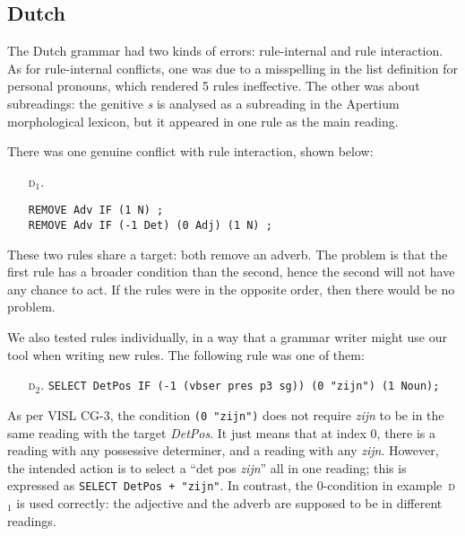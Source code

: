 \subsection{Dutch} The Dutch grammar had two kinds of errors: rule-internal and rule interaction. As for rule-internal conflicts, one was due to a misspelling in the list definition for personal pronouns, which rendered 5 rules ineffective. The other was about subreadings: the genitive \emph{s} is analysed as a subreading in the Apertium morphological lexicon, but it appeared in one rule as the main reading. 

There was one genuine conflict with rule interaction, shown below:

\begin{itemize}
\item[\textsc{d$_1$.}] 
\begin{verbatim}REMOVE Adv IF (1 N) ;
REMOVE Adv IF (-1 Det) (0 Adj) (1 N) ;
\end{verbatim}
\end{itemize}

These two rules share a target: both remove an adverb.
The problem is that the first rule has a broader condition than the second, hence the second will not have any chance to act. 
If the rules were in the opposite order, then there would be no problem.



We also tested rules individually, in a way that a grammar writer might use our tool when writing new rules.
The following rule was one of them:

\begin{itemize}
\item[\textsc{d$_2$.}] 
\texttt{SELECT DetPos IF (-1 (vbser pres p3 sg)) (0 "zijn") (1 Noun);}
\end{itemize} 

As per VISL CG-3, the condition \texttt{(0 "zijn")} does not require
 \emph{zijn} to be in the same reading with the target \emph{DetPos}.
It just means that at index 0,
there is a reading with any possessive determiner, and a reading with any \emph{zijn}.
However, the intended action is to select a ``det pos \emph{zijn}'' all in one reading;
this is expressed as \texttt{SELECT DetPos + "zijn"}.
In contrast, the 0-condition in example~\textsc{d$_1$} is used correctly:
the adjective and the adverb are supposed to be in different readings.


